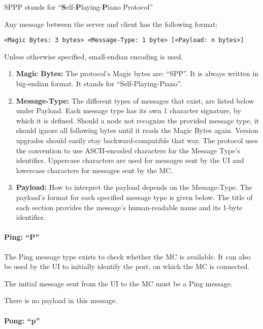 SPPP stands for \enquote{\textbf{S}elf-\textbf{P}laying-\textbf{P}iano Protocol}

Any message between the server and client has the following format:

\begin{verbatim}
<Magic Bytes: 3 bytes> <Message-Type: 1 byte> [<Payload: n bytes>]
\end{verbatim}

Unless otherwise specified, small-endian encoding is used.

\begin{enumerate}
    \item \textbf{Magic Bytes:} The protocol's Magic bytes are: \enquote{SPP}. It is always written in big-endian format. It stands for \enquote{Self-Playing-Piano}.
    \item \textbf{Message-Type:} The different types of messages that exist, are listed below under Payload. Each message type has its own 1 character signature, by which it is defined. Should a node not recognize the provided message type, it should ignore all following bytes until it reads the Magic Bytes again. Version upgrades should easily stay backward-compatible that way. The protocol uses the convention to use ASCII-encoded characters for the Message Type's identifier. Uppercase characters are used for messages sent by the UI and lowercase characters for messages sent by the MC.
    \item \textbf{Payload:} How to interpret the payload depends on the Message-Type. The payload's format for each specified message type is given below. The title of each section provides the message's human-readable name and its 1-byte identifier.
\end{enumerate}

\paragraph{Ping: \enquote{P}}

The Ping message type exists to check whether the MC is available. It can also be used by the UI to initially identify the port, on which the MC is connected.

The initial message sent from the UI to the MC must be a Ping message.

There is no payload in this message.

\paragraph{Pong: \enquote{p}}


